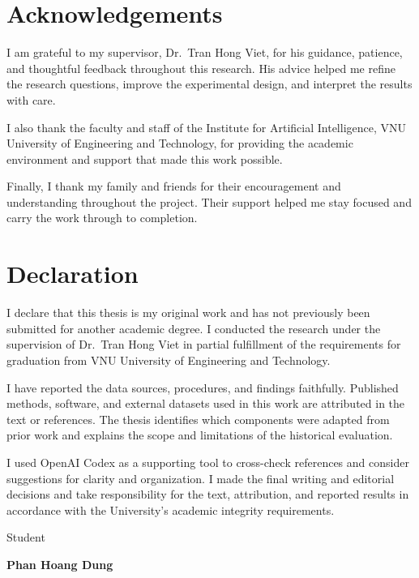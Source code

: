 \chapter*{Acknowledgements}
I am grateful to my supervisor, Dr.~Tran Hong Viet, for his guidance,
patience, and thoughtful feedback throughout this research. His advice
helped me refine the research questions, improve the experimental design,
and interpret the results with care.

I also thank the faculty and staff of the Institute for Artificial
Intelligence, VNU University of Engineering and Technology, for providing
the academic environment and support that made this work possible.

Finally, I thank my family and friends for their encouragement and
understanding throughout the project. Their support helped me stay
focused and carry the work through to completion.

\chapter*{Declaration}
I declare that this thesis is my original work and has not previously
been submitted for another academic degree. I conducted the research
under the supervision of Dr.~Tran Hong Viet in partial fulfillment of
the requirements for graduation from VNU University of Engineering and
Technology.

I have reported the data sources, procedures, and findings faithfully.
Published methods, software, and external datasets used in this work
are attributed in the text or references. The thesis identifies which
components were adapted from prior work and explains the scope and
limitations of the historical evaluation.

I used OpenAI Codex as a supporting tool to cross-check references and
consider suggestions for clarity and organization. I made the final
writing and editorial decisions and take responsibility for the text,
attribution, and reported results in accordance with the University's
academic integrity requirements.

\vspace{1.6cm}
\noindent\hfill
\begin{minipage}{.38\linewidth}
\centering
Student\par
\vspace{1.8cm}
\textbf{Phan Hoang Dung}\par
\end{minipage}\par

